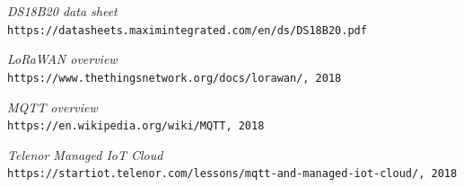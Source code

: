 	
		

\begin{thebibliography}{9}
	\textit{DS18B20 data sheet}
	\\\texttt {https://datasheets.maximintegrated.com/en/ds/DS18B20.pdf}
	
	\textit{LoRaWAN overview}
	\\\texttt {https://www.thethingsnetwork.org/docs/lorawan/, 2018}
	
	\textit{MQTT overview}
	\\\texttt {https://en.wikipedia.org/wiki/MQTT, 2018}
	
	\textit{Telenor Managed IoT Cloud}
	\\\texttt{https://startiot.telenor.com/lessons/mqtt-and-managed-iot-cloud/, 2018}
	
	
\end{thebibliography}






